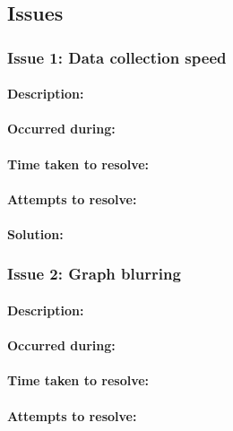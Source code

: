 	\subsection{Issues}{		
		\subsubsection{Issue 1: Data collection speed}{
			\paragraph{Description:}

			\paragraph{Occurred during:}

			\paragraph{Time taken to resolve:}

			\paragraph{Attempts to resolve:}
			
			\paragraph{Solution:}
		
		\subsubsection{Issue 2: Graph blurring}{
			\paragraph{Description:}

			\paragraph{Occurred during:}

			\paragraph{Time taken to resolve:}

			\paragraph{Attempts to resolve:}
			
}}}

